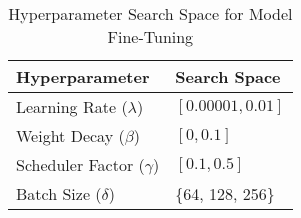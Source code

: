 \begin{table}[!ht]
    \centering
    \caption{Hyperparameter Search Space for Model Fine-Tuning}
    \label{tab:hyperparameters}
    \begin{tabular}{ll}
    \toprule
    \textbf{Hyperparameter} & \textbf{Search Space} \\
    \midrule
    Learning Rate (\( \lambda \)) & $[0.00001, 0.01]$ \\
    Weight Decay (\( \beta \)) & $[0, 0.1]$ \\
    Scheduler Factor (\(\gamma\)) & $[0.1, 0.5]$ \\
    Batch Size (\(\delta\)) & \{64, 128, 256\} \\
    \bottomrule
    \end{tabular}
\end{table}
